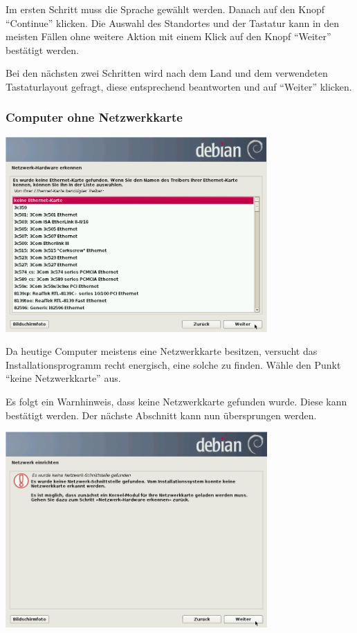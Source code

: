 \documentclass[a4paper,12pt,twoside]{article}
\begin{document}
Im ersten Schritt muss die Sprache gewählt werden. Danach auf den Knopf
"`Continue"' klicken. Die Auswahl des
Standortes und der Tastatur kann in den meisten Fällen ohne weitere
Aktion mit einem Klick auf den Knopf
"`Weiter"' bestätigt werden.

Bei den nächsten zwei Schritten wird nach dem Land und dem verwendeten
Tastaturlayout gefragt, diese entsprechend beantworten und auf
"`Weiter"' klicken.


\subsubsection{Computer ohne Netzwerkkarte}
\label{sct:inst_ohne_netzwerk}

\begin{minipage}{\linewidth}
  \centering
  \includegraphics[width=10cm]{efaLivede-img/efaLivede-img5.png}
  \label{fig:inst_netzwerkkarte}
\end{minipage}

Da heutige Computer meistens eine Netzwerkkarte besitzen, versucht das
Installationsprogramm recht energisch, eine solche zu finden. Wähle den
Punkt "`keine Netzwerkkarte"' aus.

Es folgt ein Warnhinweis, dass keine Netzwerkkarte gefunden wurde. Diese
kann bestätigt werden. Der nächste Abschnitt kann nun übersprungen
werden.

\begin{minipage}{\linewidth}
  \centering
  \includegraphics[width=10cm]{efaLivede-img/efaLivede-img6.png}
  \label{fig:inst_best_netzwerkkarte}
\end{minipage}
\end{document}
